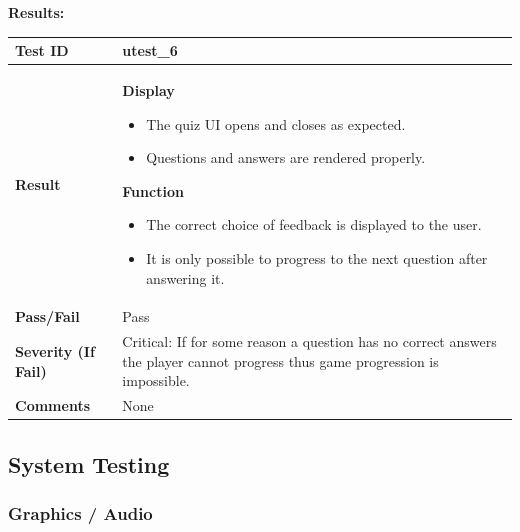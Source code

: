 \documentclass[11pt, a4paper]{article}
\begin{document}
\newpage

\noindent \textbf{Results:}

\begin{center}
\begin{tabularx}{\linewidth}{|>{\raggedright\arraybackslash}m{4cm}|X|}
    \hline
    \textbf{Test ID} & utest\_6 \\
    \hline
    \textbf{Result} &
    \textbf{Display}
    \begin{itemize}
        \item The quiz UI opens and closes as expected.
        \item Questions and answers are rendered properly.
    \end{itemize}
    \textbf{Function}
    \begin{itemize}
        \item The correct choice of feedback is displayed to the user.
        \item It is only possible to progress to the next question after answering it.
    \end{itemize}
    \\
    \hline
    \textbf{Pass/Fail} & Pass \\
    \hline
    \textbf{Severity (If Fail)} & Critical: If for some reason a question has no correct answers the player cannot progress thus game progression is impossible. \\
    \hline
    \textbf{Comments} & None \\
    \hline
\end{tabularx}
\end{center}

\newpage

\subsection{System Testing}

\subsubsection{Graphics / Audio}
\end{document}
